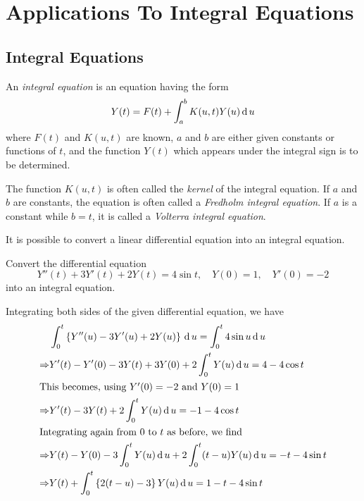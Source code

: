 \documentclass[../main-sheet.tex]{subfiles}
\begin{document}
\section{Applications To Integral Equations}
\subsection{Integral Equations}
An \emph{integral equation} is an equation having the form
\[
    Y(t)=F(t)+\int_a^b K(u,t)Y(u)\,\mathrm{d}\, u
\]
where $ F(t) $ and  $ K(u, t) $ are known, $ a $ and $ b $ are either given constants or functions of $ t $, and the function $ Y(t) $ which appears under the integral sign is to be determined.

The function $ K(u, t) $ is often called the \emph{kernel} of the integral equation. If $ a $ and $ b $ are constants, the equation is often called a \emph{Fredholm integral equation}. If $ a $ is a constant while $ b = t $, it is called a \emph{Volterra integral equation}.

It is possible to convert a linear differential equation into an integral equation.
\begin{prob}
    Convert the differential equation
    \[
        Y''(t)+3Y'(t)+2Y(t)=4\sin t,\quad Y(0)=1,\quad Y'(0)=-2
    \]
    into an integral equation.
\end{prob}
\begin{soln}
    Integrating both sides of the given differential equation, we have
    \begin{align*}
        & \int_0^t \left\{ Y''(u)-3Y'(u)+2Y(u) \right\}\,\mathrm{d}\, u=\int_0^t 4 \sin u \,\mathrm{d}\, u\\
        \Rightarrow& Y'(t)-Y'(0)-3Y(t)+3Y(0)+2\int_0^t Y(u)\,\mathrm{d}\, u=4-4\cos t\\
        \intertext{This becomes, using $ Y'(0)=-2 $ and $ Y(0)=1 $}
        \Rightarrow& Y'(t)-3Y(t)+2\int_0^t Y(u)\,\mathrm{d}\, u=-1-4\cos t\\
        \intertext{Integrating again from 0 to $ t $ as before, we find}
        \Rightarrow& Y(t)-Y(0)-3\int_0^t Y(u)\,\mathrm{d}\, u+2\int_0^t (t-u)Y(u)\,\mathrm{d}\, u=-t-4\sin t\\
        \Rightarrow& Y(t)+\int_0^t \left\{ 2(t-u)-3 \right\}Y(u)\,\mathrm{d}\, u=1-t-4\sin t
    \end{align*}
\end{soln}
\end{document}
